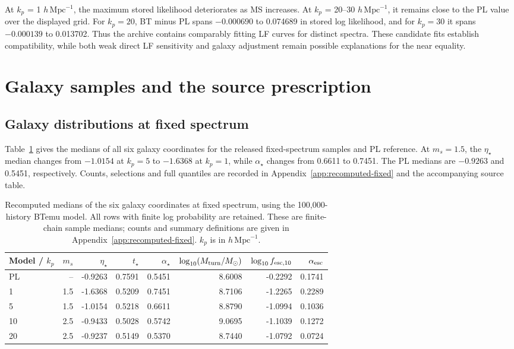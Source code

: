 At \ensuremath{k_p} = 1 $h\,\mathrm{Mpc}^{-1}$, the maximum stored likelihood deteriorates as MS increases. At \ensuremath{k_p} = 20--30 $h\,\mathrm{Mpc}^{-1}$, it remains close to the PL value over the displayed grid. For $k_p=20$, BT minus PL spans $-0.000690$ to 0.074689 in stored log likelihood, and for $k_p=30$ it spans $-0.000139$ to 0.013702. Thus the archive contains comparably fitting LF curves for distinct spectra. These candidate fits establish compatibility, while both weak direct LF sensitivity and galaxy adjustment remain possible explanations for the near equality.

\section{Galaxy samples and the source prescription}\label{inference-status}

\subsection{Galaxy distributions at fixed spectrum}\label{fixed-spectrum-100k}

Table~\ref{tab:fixed-100k} gives the medians of all six galaxy coordinates for the released fixed-spectrum samples and PL reference. At $m_s=1.5$, the $\eta_\star$ median changes from $-1.0154$ at $k_p=5$ to $-1.6368$ at $k_p=1$, while $\alpha_\star$ changes from 0.6611 to 0.7451. The PL medians are $-0.9263$ and 0.5451, respectively. Counts, selections and full quantiles are recorded in Appendix~\ref{app:recomputed-fixed} and the accompanying source table.

\begin{table}[t]\centering\small
\caption{Recomputed medians of the six galaxy coordinates at fixed spectrum, using the 100,000-history BTemu model. All rows with finite log probability are retained. These are finite-chain sample medians; counts and summary definitions are given in Appendix~\ref{app:recomputed-fixed}. $k_p$ is in $h\,\mathrm{Mpc}^{-1}$.}\label{tab:fixed-100k}
\begin{tabular*}{\textwidth}{@{\extracolsep{\fill}}lrrrrrrr}\toprule
Model / $k_p$ & $m_s$ & $\eta_\star$ & $t_\star$ & $\alpha_\star$ & $\log_{10}(M_{\rm turn}/M_\odot)$ & $\log_{10} f_{{\rm esc},10}$ & $\alpha_{\rm esc}$\\\midrule
PL & -- & -0.9263 & 0.7591 & 0.5451 & 8.6008 & -0.2292 & 0.1741\\
1 & 1.5 & -1.6368 & 0.5209 & 0.7451 & 8.7106 & -1.2265 & 0.2289\\
5 & 1.5 & -1.0154 & 0.5218 & 0.6611 & 8.8790 & -1.0994 & 0.1036\\
10 & 2.5 & -0.9433 & 0.5028 & 0.5742 & 9.0695 & -1.1039 & 0.1272\\
20 & 2.5 & -0.9237 & 0.5149 & 0.5370 & 8.7440 & -1.0792 & 0.0724\\
\bottomrule\end{tabular*}\end{table}

